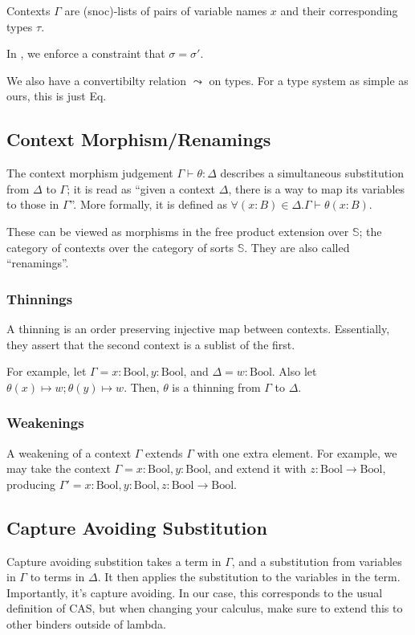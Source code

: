 Contexts $\Gamma$ are (snoc)-lists of pairs of variable names $x$ and their corresponding types $\tau$.

In \Elim{$\to$}, we enforce a constraint that $\sigma = \sigma'$.

We also have a convertibilty relation $\leadsto$ on types. For a type system as simple as ours, this is just Eq.

\subsection{Context Morphism/Renamings}
The context morphism judgement $\Gamma \vdash \theta : \Delta$ describes a simultaneous substitution from $\Delta$ to $\Gamma$; it is read as ``given a context $\Delta$, there is a way to map its variables to those in $\Gamma$''. More formally, it is defined as $\forall (x : B) \in \Delta. \Gamma \vdash \theta (x : B)$.

These can be viewed as morphisms in the free product extension over $\mathbb{S}$; the category of contexts over the category of sorts $\mathbb{S}$. They are also called ``renamings''.

\subsubsection{Thinnings}
A thinning is an order preserving injective map between contexts. Essentially, they assert that the second context is a sublist of the first.

For example, let $\Gamma = x : \mathrm{Bool}, y : \mathrm{Bool}$, and $\Delta = w : \mathrm{Bool}$. Also let $\theta(x) \mapsto w; \theta(y) \mapsto w$. Then, $\theta$ is a thinning from $\Gamma$ to $\Delta$.

\subsubsection{Weakenings}
A weakening of a context $\Gamma$ extends $\Gamma$ with one extra element. For example, we may take the context $\Gamma = x : \mathrm{Bool}, y : \mathrm{Bool}$, and extend it with $z : \mathrm{Bool} \to \mathrm{Bool}$, producing $\Gamma' = x : \mathrm{Bool}, y : \mathrm{Bool}, z : \mathrm{Bool} \to \mathrm{Bool}$.


\subsection{Capture Avoiding Substitution}
Capture avoiding substition takes a term in $\Gamma$, and a substitution from variables in $\Gamma$ to terms in $\Delta$. It then applies the substitution to the variables in the term. Importantly, it's capture avoiding. In our case, this corresponds to the usual definition of CAS, but when changing your calculus, make sure to extend this to other binders outside of lambda.

